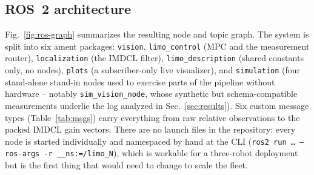\documentclass[10pt,conference]{IEEEtran}
\begin{document}
\subsection{ROS~2 architecture}
\label{sec:ros-architecture}

Fig.~\ref{fig:ros-graph} summarizes the resulting node and topic graph. The system is split into
six ament packages: \texttt{vision}, \texttt{limo\_control} (MPC and the measurement router),
\texttt{localization} (the IMDCL filter), \texttt{limo\_description} (shared constants only, no
nodes), \texttt{plots} (a subscriber-only live visualizer), and \texttt{simulation} (four
stand-alone stand-in nodes used to exercise parts of the pipeline without hardware -- notably
\texttt{sim\_vision\_node}, whose synthetic but schema-compatible measurements underlie the log
analyzed in Sec.~\ref{sec:results}). Six custom message types (Table~\ref{tab:msgs}) carry
everything from raw relative observations to the packed IMDCL gain vectors. There are no launch
files in the repository: every node is started individually and namespaced by hand at the CLI
(\texttt{ros2 run \dots\ --ros-args -r \_\_ns:=/limo\_N}), which is workable for a three-robot
deployment but is the first thing that would need to change to scale the fleet.
\end{document}

